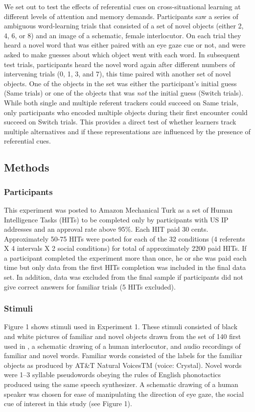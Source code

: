 \documentclass[10pt,letterpaper]{article}
\begin{document}
We set out to test the effects of referential cues on cross-situational learning at different levels of attention and memory demands. Participants saw a series of ambiguous word-learning trials that consisted of a set of novel objects (either 2, 4, 6, or 8) and an image of a schematic, female interlocutor. On each trial they heard a novel word that was either paired with an eye gaze cue or not, and were asked to make guesses about which object went with each word. In subsequent test trials, participants heard the novel word again after different numbers of intervening trials (0, 1, 3, and 7), this time paired with another set of novel objects. One of the objects in the set was either the participant's initial guess (Same trials) or one of the objects that was \emph{not} the initial guess (Switch trials). While both single and multiple referent trackers could succeed on Same trials, only participants who encoded multiple objects during their first encounter could succeed on Switch trials. This provides a direct test of whether learners track multiple alternatives and if these representations are influenced by the presence of referential cues. 

\subsection{Methods}

\subsubsection{Participants}

This experiment was posted to Amazon Mechanical Turk as a set of
Human Intelligence Tasks (HITs) to be completed only by participants with US IP
addresses and an approval rate above 95\%. Each HIT paid 30 cents. Approximately 50-75 HITs were posted for each of the 32 conditions (4 referents X 4 intervals X 2 social conditions) for total of approximately 2200 paid HITs. If a participant completed the experiment more than once, he or she was paid each time but only data from the first HITs completion was included in the final data set. In
addition, data was excluded from the final sample if participants did not give correct answers for familiar trials (5 HITs excluded).

\subsubsection{Stimuli}
Figure 1 shows stimuli used in Experiment 1. These stimuli consisted of black and white pictures of familiar and novel objects drawn from the set of 140 first used in , a schematic drawing of a human interlocutor, and audio recordings of familiar and novel words. 
Familiar words consisted of the labels for the familiar objects as produced by AT\&T Natural VoicesTM (voice: Crystal). Novel words were 1--3 syllable pseudowords obeying the rules of English phonotactics produced using the same speech synthesizer. 
A schematic drawing of a human speaker was chosen for ease of manipulating the direction of eye gaze, the social cue of interest in this study (see Figure 1). 
\end{document}
